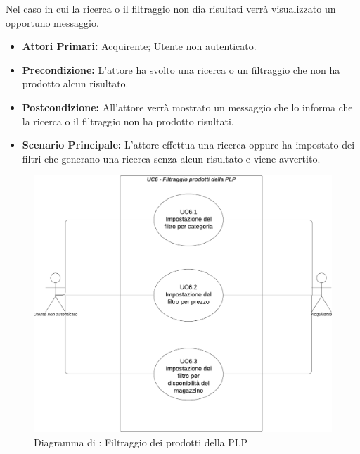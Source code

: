 \resetSubUC

Nel caso in cui la ricerca o il filtraggio non dia risultati verrà visualizzato un opportuno messaggio.
\begin{itemize}
    \item \textbf{Attori Primari:} Acquirente; Utente non autenticato. 
    \item \textbf{Precondizione:} L'attore ha svolto una ricerca o un filtraggio che non ha prodotto alcun risultato.
    \item \textbf{Postcondizione:} All'attore verrà mostrato un messaggio che lo informa che la ricerca o il filtraggio non ha prodotto risultati.
    \item \textbf{Scenario Principale:} L'attore effettua una ricerca oppure ha impostato dei filtri che generano una ricerca senza alcun risultato e viene avvertito.
\end{itemize}

\begin{figure}[H]
    \centering
    \includegraphics[scale=0.5]{Immagini/DiagrammiUC/UC6FiltraggioProdottiDellaPLP.png}
    \caption{Diagramma di \actualUC: Filtraggio dei prodotti della PLP} 
\end{figure}

